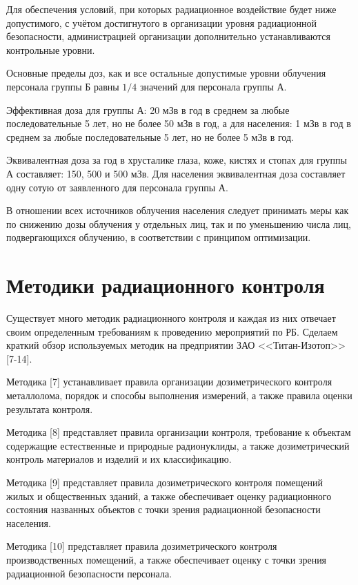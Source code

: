 	Для обеспечения условий, при которых радиационное воздействие будет ниже 
	допустимого, с учётом достигнутого в организации уровня радиационной 
	безопасности, администрацией организации дополнительно устанавливаются 
	контрольные уровни.

	Основные пределы доз, как и все остальные допустимые уровни облучения 
	персонала группы Б равны \( 1/4 \) значений для персонала группы А.

	Эффективная доза для группы А: 20 мЗв в год в среднем за любые 
	последовательные 5 лет, но не более 50 мЗв в год, а для населения:
	1 мЗв в год в среднем за любые последовательные 5 лет, но не более 
	5 мЗв в год.

	Эквивалентная доза за год в хрусталике глаза, коже, кистях и стопах 
	для группы А составляет: 150, 500 и 500 мЗв. Для населения эквивалентная 
	доза составляет одну сотую от заявленного для персонала группы А.

	В отношении всех источников облучения населения следует принимать 
	меры как по снижению дозы облучения у отдельных лиц, так и по 
	уменьшению числа лиц, подвергающихся облучению, в соответствии с 
	принципом оптимизации.

\section{Методики радиационного контроля}
	Существует много методик радиационного контроля и каждая из них отвечает 
	своим определенным требованиям к проведению мероприятий по РБ. Сделаем 
	краткий обзор используемых методик на предприятии ЗАО 
	<<Титан-Изотоп>> [7-14].

	Методика [7] устанавливает правила организации дозиметрического 
    контроля металлолома, порядок и способы выполнения измерений, а 
    также правила оценки результата контроля.

	Методика [8] представляет правила организации контроля, требование к 
    объектам содержащие естественные и природные радионуклиды, а также 
    дозиметрический контроль материалов и изделий и их классификацию.

	Методика [9] представляет правила дозиметрического контроля помещений 
	жилых и общественных зданий, а также обеспечивает оценку радиационного 
	состояния названных объектов с точки зрения радиационной безопасности 
	населения. 

	Методика [10] представляет правила дозиметрического контроля 
    производственных помещений, а также обеспечивает оценку с точки 
    зрения радиационной безопасности персонала.

